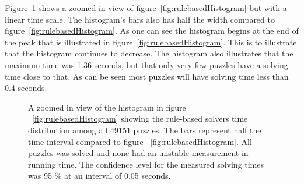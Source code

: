 \documentclass[a4paper,11pt]{kth-mag}
\begin{document}
Figure~\ref{fig:rulebasedHistogram2} shows a zoomed in view of figure~\ref{fig:rulebasedHistogram} but with a linear time scale.
The histogram's bars also has half the width compared to figure~\ref{fig:rulebasedHistogram}.
As one can see the histogram begins at the end of the peak that is illustrated in figure~\ref{fig:rulebasedHistogram}.
This is to illustrate that the histogram continues to decrease.
The histogram also illustrates that the maximum time was 1.36 seconds, but that only very few puzzles have a solving time close to that.
As can be seen most puzzles will have solving time less than 0.4 seconds.
\\
\begin{figure}[here] 
\noindent{}
\vspace{-40pt}
\caption[Histogram with solving times for rule-based in a zoomed in view]{A zoomed in view of the histogram in figure ~\ref{fig:rulebasedHistogram} showing the rule-based solvers time distribution among all 49151 puzzles. The bars represent half the time interval compared to figure ~\ref{fig:rulebasedHistogram}. All puzzles was solved and none had an unstable measurement in running time. The confidence level for the measured solving times was 95 \% at an interval of 0.05 seconds.}
\label{fig:rulebasedHistogram2}
\end{figure}
\end{document}

